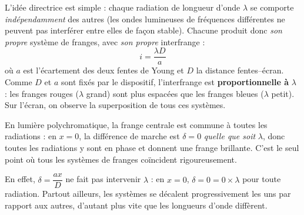 \documentclass[11pt]{article}
\newcommand{\cle}[1]{{\popxbold\color{popdark}#1}}
\begin{document}
L'idée directrice est simple : chaque radiation de longueur d'onde $\lambda$ se comporte \emph{indépendamment} des autres (les ondes lumineuses de fréquences différentes ne peuvent pas interférer entre elles de façon stable). Chacune produit donc \emph{son propre} système de franges, avec \emph{son propre} interfrange :
\[ i = \frac{\lambda D}{a} \]
où $a$ est l'écartement des deux fentes de Young et $D$ la distance fentes--écran. Comme $D$ et $a$ sont fixés par le dispositif, l'interfrange est \textbf{proportionnelle à} $\lambda$ : les franges rouges ($\lambda$ grand) sont plus espacées que les franges bleues ($\lambda$ petit). Sur l'écran, on observe la superposition de tous ces systèmes.

\begin{propriete}
En lumière polychromatique, la \cle{frange centrale} est commune à toutes les radiations : en $x = 0$, la différence de marche est $\delta = 0$ \emph{quelle que soit} $\lambda$, donc toutes les radiations y sont en phase et donnent une frange brillante. C'est le seul point où tous les systèmes de franges coïncident rigoureusement.
\end{propriete}

En effet, $\delta = \dfrac{ax}{D}$ ne fait pas intervenir $\lambda$ : en $x = 0$, $\delta = 0 = 0 \times \lambda$ pour toute radiation. Partout ailleurs, les systèmes se décalent progressivement les uns par rapport aux autres, d'autant plus vite que les longueurs d'onde diffèrent.
\end{document}
